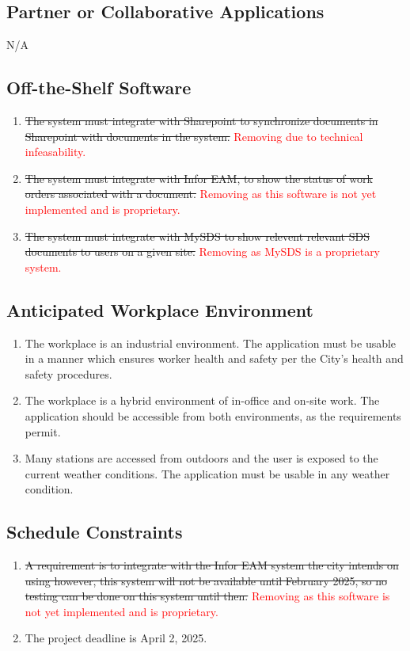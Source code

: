 \documentclass[12pt]{article}
\begin{document}
\subsection{Partner or Collaborative Applications}
N/A
\subsection{Off-the-Shelf Software}
\begin{enumerate} [{C-OTS}1.]
  \item \sout{ The system must integrate with Sharepoint to synchronize documents in
    Sharepoint with documents in the system.} \textcolor{red}{Removing due to technical infeasability.}
  \item \sout{ The system must integrate with Infor EAM, to show the status of work
    orders associated with a document.} \textcolor{red}{Removing as this software is not yet implemented and is proprietary.}
  \item \sout{The system must integrate with MySDS to show relevent relevant SDS
    documents to users on a given site.} \textcolor{red}{Removing as MySDS is a proprietary system.}
\end{enumerate}

\subsection{Anticipated Workplace Environment}
\begin{enumerate} [{C-AWE}1.]
  \item The workplace is an industrial environment. The application must
    be usable in a manner which ensures worker health and safety per the
    City's health and safety procedures.
  \item The workplace is a hybrid environment of in-office and on-site
    work. The application should be accessible from both environments, as
    the requirements permit.
  \item Many stations are accessed from outdoors and the user is exposed to
    the current weather conditions. The application must be usable in any
    weather condition.
\end{enumerate}

\subsection{Schedule Constraints}
\begin{enumerate} [{C-SCH}1.]
  \item \sout{A requirement is to integrate with the Infor EAM system the city intends
    on using however, this system will not be available until
    February 2025, so no testing can be done on this system until then.} 
    \textcolor{red}{Removing as this software is not yet implemented and is proprietary.}

  \item The project deadline is April 2, 2025.
\end{enumerate}
\end{document}
